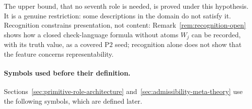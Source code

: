 \documentclass[11pt]{article}
\theoremstyle{definition}
\newcommand{\Ptwo}{\ensuremath{\mathrm{P2}}}
\begin{document}
\begin{itemize}[topsep=2pt,itemsep=1pt]
    The upper bound, that no seventh role is needed, is proved under this
    hypothesis. It is a genuine restriction: some descriptions in the
    domain do not satisfy it. Recognition constrains presentation, not content:
    Remark~\ref{rem:recognition-open} shows how a closed check-language
    formula without atoms \(W_j\) can be recorded, with its truth value, as a
    covered \Ptwo{} seed; recognition alone does not show that the feature
    concerns representability.
\end{itemize}

\paragraph{Symbols used before their definition.} Sections~\ref{sec:primitive-role-architecture}
and~\ref{sec:admissibility-meta-theory} use the following symbols, which are
defined later.
\end{document}
